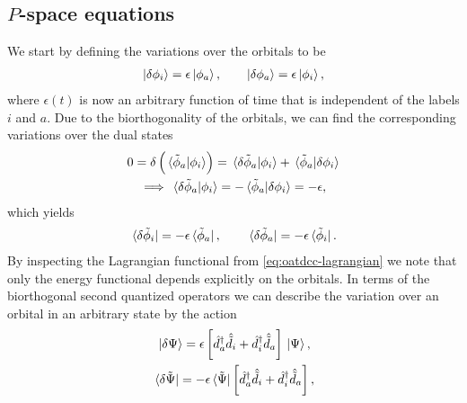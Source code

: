         \subsection{$P$-space equations}
            We start by defining the variations over the orbitals to be
            \begin{align}
                \ket{\delta\phi_i} = \epsilon\ket{\phi_a},
                \qquad
                \ket{\delta\phi_a} = \epsilon\ket{\phi_i},
            \end{align}
            where $\epsilon(t)$ is now an arbitrary function of time that is
            independent of the labels $i$ and $a$.
            Due to the biorthogonality of the orbitals, we can find the
            corresponding variations over the dual states
            \begin{gather}
                0 = \delta\left( \braket*{\tilde{\phi}_a}{\phi_i} \right)
                = \braket*{\delta\tilde{\phi}_a}{\phi_i}
                + \braket*{\tilde{\phi}_a}{\delta\phi_i}
                \\
                \implies
                \braket*{\delta\tilde{\phi}_a}{\phi_i}
                = -\braket*{\tilde{\phi}_a}{\delta\phi_i}
                = -\epsilon,
            \end{gather}
            which yields
            \begin{gather}
                \bra*{\delta\tilde{\phi}_i}
                = -\epsilon\bra*{\tilde{\phi}_a},
                \qquad
                \bra*{\delta\tilde{\phi}_a}
                = -\epsilon\bra*{\tilde{\phi}_i}.
            \end{gather}
            By inspecting the Lagrangian functional from
            \autoref{eq:oatdcc-lagrangian} we note that only the energy
            functional depends explicitly on the orbitals.
            In terms of the biorthogonal second quantized operators we can
            describe the variation over an orbital in an arbitrary state by the
            action
            \begin{gather}
                \ket*{\delta\Psi}
                = \epsilon\left[ 
                    \hat{d}^{\dagger}_{a}\hat{\tilde{d}}_{i}
                    + \hat{d}^{\dagger}_{i}\hat{\tilde{d}}_{a}
                 \right]\ket*{\Psi},
                \\
                \bra*{\delta\tilde{\Psi}}
                = -\epsilon\bra*{\tilde{\Psi}}\left[ 
                    \hat{d}^{\dagger}_{a}\hat{\tilde{d}}_{i}
                    + \hat{d}^{\dagger}_{i}\hat{\tilde{d}}_{a}
                 \right],
            \end{gather}
